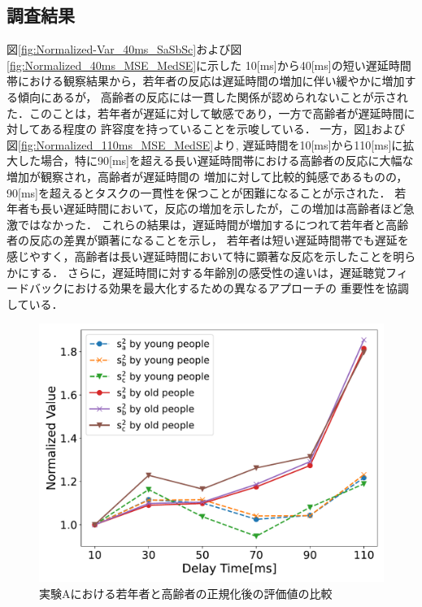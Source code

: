 \subsection{調査結果}
図\ref{fig:Normalized-Var_40ms_SaSbSc}および図\ref{fig:Normalized_40ms_MSE_MedSE}に示した
10[ms]から40[ms]の短い遅延時間帯における観察結果から，若年者の反応は遅延時間の増加に伴い緩やかに増加する傾向にあるが，
高齢者の反応には一貫した関係が認められないことが示された．このことは，若年者が遅延に対して敏感であり，一方で高齢者が遅延時間に対してある程度の
許容度を持っていることを示唆している．
一方，図\ref{fig:Normalized-Var_110ms_SaSbSc}および図\ref{fig:Normalized_110ms_MSE_MedSE}より,
遅延時間を10[ms]から110[ms]に拡大した場合，特に90[ms]を超える長い遅延時間帯における高齢者の反応に大幅な増加が観察され，高齢者が遅延時間の
増加に対して比較的鈍感であるものの，90[ms]を超えるとタスクの一貫性を保つことが困難になることが示された．
若年者も長い遅延時間において，反応の増加を示したが，この増加は高齢者ほど急激ではなかった．
これらの結果は，遅延時間が増加するにつれて若年者と高齢者の反応の差異が顕著になることを示し，
若年者は短い遅延時間帯でも遅延を感じやすく，高齢者は長い遅延時間において特に顕著な反応を示したことを明らかにする．
さらに，遅延時間に対する年齢別の感受性の違いは，遅延聴覚フィードバックにおける効果を最大化するための異なるアプローチの
重要性を協調している．
\begin{figure}[tbp]
  \centering
  \includegraphics[scale=0.3]{figures/Honbann/Comparison_young_old/110_var_normalized.pdf}
  \caption{実験Aにおける若年者と高齢者の正規化後の評価値の比較}
  \label{fig:Normalized-Var_110ms_SaSbSc}
\end{figure}
